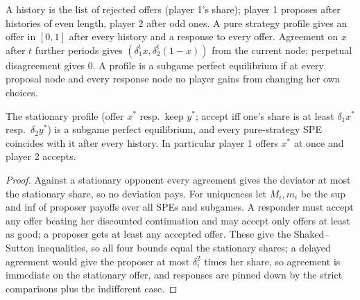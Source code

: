\begin{definition}
\label{def:barg-game}
\leanok
A history is the list of rejected offers (player 1's share); player 1 proposes after histories of even length,
player 2 after odd ones. A pure strategy profile gives an offer in $[0,1]$ after every history and a response to every
offer. Agreement on $x$ after $t$ further periods gives $(\delta_1^t x, \delta_2^t (1-x))$ from the current node; perpetual
disagreement gives $0$. A profile is a subgame perfect equilibrium if at every proposal node and every response node
no player gains from changing her own choices.
\end{definition}

\begin{theorem}[Rubinstein 1982]
\label{thm:rubinstein-game}
\leanok
{}
The stationary profile (offer $x^*$ resp.\ keep $y^*$; accept iff one's share is at least $\delta_1 x^*$ resp.\ $\delta_2 y^*$) is
a subgame perfect equilibrium, and every pure-strategy SPE coincides with it after every history. In particular
player 1 offers $x^*$ at once and player 2 accepts.
\end{theorem}
\begin{proof}
\leanok
Against a stationary opponent every agreement gives the deviator at most the stationary share, so no deviation pays.
For uniqueness let $M_i, m_i$ be the sup and inf of proposer payoffs over all SPEs and subgames. A responder
must accept any offer beating her discounted continuation and may accept only offers at least as good; a proposer gets
at least any accepted offer. These give the Shaked--Sutton inequalities, so all four bounds equal the stationary
shares; a delayed agreement would give the proposer at most $\delta_i^2$ times her share, so agreement is immediate on the
stationary offer, and responses are pinned down by the strict comparisons plus the indifferent case.
\end{proof}
